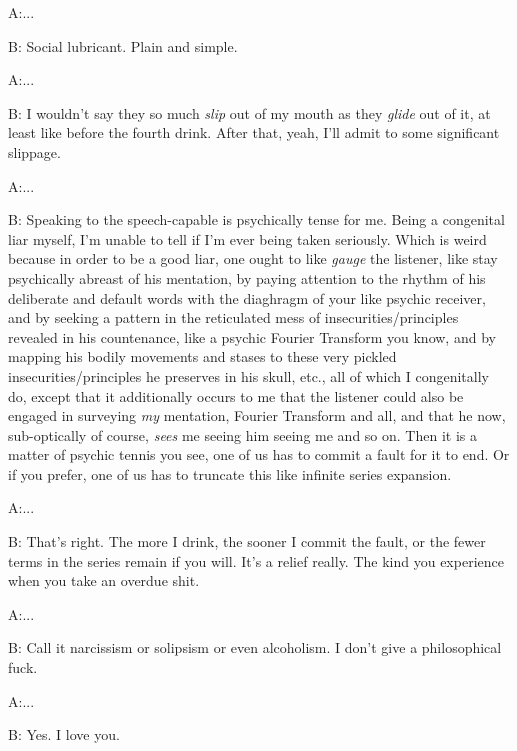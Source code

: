 \documentclass{article}
\begin{document}
\newline

A:...

B: Social lubricant. Plain and simple.
\newline
\newline

A:...

B: I wouldn't say they so much \textit{slip} out of my mouth as they
\textit{glide} out of it, at least like before the fourth drink. After
that, yeah, I'll admit to some significant slippage. \newline
\newline
\newline

A:...

B: Speaking to the speech-capable is psychically tense for me. Being
a congenital liar myself, I'm unable to tell if I'm ever being taken
seriously. Which is weird because in order to be a good liar, one ought
to like \textit{gauge} the listener, like stay psychically abreast of
his mentation, by paying attention to the rhythm of his deliberate and
default words with the diaghragm of your like psychic receiver, and by
seeking a pattern in the reticulated mess of insecurities/principles
revealed in his countenance, like a psychic Fourier Transform you know,
and by mapping his bodily movements and stases to these very pickled
insecurities/principles he preserves in his skull, etc., all of which
I congenitally do, except that it additionally occurs to me that the
listener could also be engaged in surveying \textit{my} mentation,
Fourier Transform and all, and that he now, sub-optically of course,
\textit{sees} me seeing him seeing me and so on. Then it is a matter of
psychic tennis you see, one of us has to commit a fault for it to end.
Or if you prefer, one of us has to truncate this like infinite series
expansion. \newline \newline

A:...

B: That's right. The more I drink, the sooner I commit the fault, or the
fewer terms in the series remain if you will. It's a relief really. The
kind you experience when you take an overdue shit. \newline \newline

A:...

B: Call it narcissism or solipsism or even alcoholism. I don't give
a philosophical fuck.
\newline
\newline

A:...

B: Yes. I love you.
\newline
\newline
\end{document}
